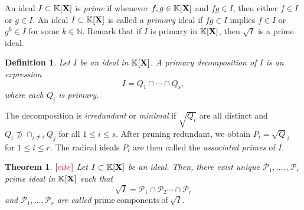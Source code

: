 \documentclass[11pt]{article}
\numberwithin{Property}{section}
\newtheorem{Theorem}{Theorem}%
\numberwithin{Theorem}{section}
\numberwithin{Proposition}{section}
\numberwithin{Lemma}{section}
\numberwithin{Corollary}{section}
\newtheorem{Definition}{Definition}%
\numberwithin{Definition}{section}
\numberwithin{Remark}{section}
\numberwithin{Conjecture}{section}
\numberwithin{Problem}{section}
\numberwithin{Claim}{section}
\theoremstyle{definition}
\numberwithin{Example}{section}
\renewcommand{\leq}{\leqslant}
\newcommand{\field}{\mathbb{K}} %
\newcommand{\mat}[1]{\mathbf{\MakeUppercase{#1}}} %
\newcommand{\todo}[1]{\textcolor{red}{#1}} %
\begin{document}
An ideal $I \subset \field[\mat{X}]$ is \emph{prime} if whenever $f,g \in \field[\mat{X}]$ and $fg \in I$, then either $f \in I$ or $g \in I$. An ideal $I \subset \field[\mat{X}]$ is called a \emph{primary} ideal if $fg \in I$ implies $f \in I$ or $g^k \in I$ for some $k \in \mathbb{N}$. Remark that if $I$ is primary in $\field[\mat{X}]$, then $\sqrt{I}$ is a prime ideal. 
\begin{Definition}
Let $I$ be an ideal in $\field[\mat{X}]$. A \emph{primary decomposition} of $I$ is an expression 
\[
I = Q_1 \cap \cdots \cap Q_s,
\]
where each $Q_i$ is primary.
\end{Definition}
The decomposition is \emph{irredundant} or \emph{minimal} if $\sqrt{Q_i}$ are all distinct and $Q_i \not \supset \cap_{j \ne i}Q_j$ for all $1 \leq i \leq s$. After pruning redundant,  we obtain $P_i = \sqrt{Q}_i$ for $1 \leq i \leq r$. The radical ideals $P_i$ are then called the \emph{associated primes} of $I$. 
\begin{Theorem}$[\todo{cite}]$ Let $I \subset \field[\mat{X}]$ be an ideal. Then, there exist unique $\mathcal{P}_1, \ldots,, \mathcal{P}_r$ prime ideal in $\field[\mat{X}]$ such that 
\[
\sqrt{I} = \mathcal{P}_1 \cap \mathcal{P}_2 \cdots \cap \mathcal{P}_r
\]
and $\mathcal{P}_1, \ldots, \mathcal{P}_r$ are called $\mathrm{prime \ components \ of} \ \sqrt{I}$. 
\end{Theorem} 
\end{document}
